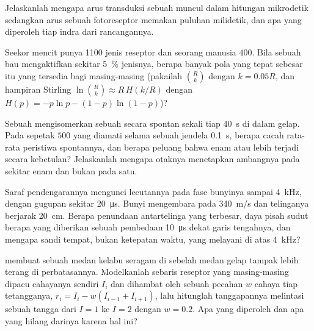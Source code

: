 \begin{exercise}[$\star\star$]\label{exo:b3:sensory-systems:8}
Jelaskanlah mengapa arus transduksi sebuah  muncul dalam
hitungan mikrodetik sedangkan arus sebuah fotoreseptor memakan puluhan
milidetik, dan apa yang diperoleh tiap indra dari rancangannya.
\end{exercise}

\begin{exercise}[$\star\star$]\label{exo:b3:sensory-systems:9}
Seekor mencit punya \num{1100} jenis reseptor dan seorang manusia $400$. Bila sebuah bau
mengaktifkan sekitar \qty{5}{\%} jenisnya, berapa banyak pola yang tepat
sebesar itu yang tersedia bagi masing-masing (pakailah $\binom{R}{k}$ dengan $k = 0.05R$,
dan hampiran Stirling $\ln\binom{R}{k} \approx R\,H(k/R)$ dengan
$H(p) = -p\ln p - (1-p)\ln(1-p)$)?
\end{exercise}

\begin{exercise}[$\star\star\star$]\label{exo:b3:sensory-systems:10}
Sebuah  mengisomerkan sebuah  secara spontan sekali tiap \qty{40}{s} di
dalam gelap. Pada sepetak $500$  yang diamati selama sebuah jendela \qty{0.1}{s},
berapa cacah rata-rata peristiwa spontannya, dan berapa peluang
bahwa enam atau lebih terjadi secara kebetulan? Jelaskanlah mengapa otaknya menetapkan
ambangnya pada sekitar enam dan bukan pada satu.
\end{exercise}

\begin{exercise}[$\star\star\star$]\label{exo:b3:sensory-systems:11}
Saraf pendengarannya mengunci lecutannya pada fase bunyinya sampai
\qty{4}{kHz}, dengan gugupan sekitar \qty{20}{\micro s}. Bunyi mengembara
pada \qty{340}{m/s} dan telinganya berjarak \qty{20}{cm}. Berapa
penundaan antartelinga yang terbesar, daya pisah sudut berapa yang diberikan sebuah
pembedaan \qty{10}{\micro s} dekat garis tengahnya, dan mengapa
sandi tempat, bukan ketepatan waktu, yang melayani di atas \qty{4}{kHz}?
\end{exercise}

\begin{exercise}[$\star\star\star$]\label{exo:b3:sensory-systems:12}
 membuat sebuah medan kelabu seragam di sebelah medan gelap tampak
lebih terang di perbatasannya. Modelkanlah sebaris reseptor yang masing-masing dipacu cahayanya
sendiri $I_{i}$ dan dihambat oleh sebuah pecahan $w$ cahaya tiap tetangganya,
$r_{i} = I_{i} - w(I_{i-1} + I_{i+1})$, lalu hitunglah tanggapannya melintasi
sebuah tangga dari $I = 1$ ke $I = 2$ dengan $w = 0.2$. Apa yang diperoleh 
dan apa yang hilang darinya karena hal ini?
\end{exercise}

